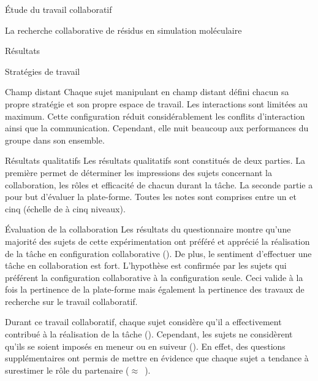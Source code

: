 \documentclass[myfrancais]{mythesis}
\begin{document}
\begin{mypart}{Étude du travail collaboratif}
\begin{mychapter}{La recherche collaborative de résidus en simulation moléculaire}
\begin{mysection}{Résultats}
\begin{mysubsection}{Stratégies de travail}
\begin{mysubsubsection}{Champ distant}
						Chaque sujet manipulant en champ distant défini chacun sa propre stratégie et son propre espace de travail.
						Les interactions sont limitées au maximum.
						Cette configuration réduit considérablement les conflits d'interaction ainsi que la communication.
						Cependant, elle nuit beaucoup aux performances du groupe dans son ensemble.
					\end{mysubsubsection}
				\end{mysubsection}
				\begin{mysubsection}{Résultats qualitatifs}
					Les résultats qualitatifs sont constitués de deux parties.
					La première permet de déterminer les impressions des sujets concernant la collaboration, les rôles et efficacité de chacun durant la tâche.
					La seconde partie a pour but d'évaluer la plate-forme.
					Toutes les notes sont comprises entre un et cinq (échelle de  à cinq niveaux).
					\begin{mysubsubsection}{Évaluation de la collaboration}
						Les résultats du questionnaire montre qu'une majorité des sujets de cette expérimentation ont préféré et apprécié la réalisation de la tâche en configuration collaborative ().
						De plus, le sentiment d'effectuer une tâche en collaboration est fort.
						L'hypothèse  est confirmée par les sujets qui préférent la configuration collaborative à la configuration seule.
						Ceci valide à la fois la pertinence de la plate-forme mais également la pertinence des travaux de recherche sur le travail collaboratif.

						Durant ce travail collaboratif, chaque sujet considère qu'il a effectivement contribué à la réalisation de la tâche ().
						Cependant, les sujets ne considèrent qu'ils se soient imposés en meneur ou en suiveur ().
						En effet, des questions supplémentaires ont permis de mettre en évidence que chaque sujet a tendance à surestimer le rôle du partenaire ($\approx$~).


\end{mysubsubsection}
\end{mysubsection}
\end{mysection}
\end{mychapter}
\end{mypart}
\end{document}
